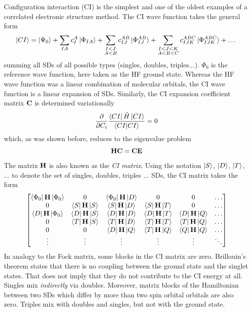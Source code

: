 Configuration interaction (CI) is the simplest and one of the oldest examples of a correlated electronic structure method. The CI wave function takes the general form
\begin{equation}
\ket{CI} = \ket{\smash{\Psi_0}} + \sum_{IA} c_{I}^{A} \ket{\smash{\Phi_{IA}}} + \sum_{\substack{I < J \\ A < B}} c_{IJ}^{AB} \ket{\smash{\Phi_{IJ}^{AB}}} + \sum_{\substack{I < J < K \\ A < B < C}} c_{IJK}^{ABC} \ket{\smash{\Phi_{IJK}^{ABC}}} + \dots
\end{equation}
\noindent summing all SDs of all possible types (singles, doubles, triples...). $\Phi_0$ is the reference wave function, here taken as the HF ground state. Whereas the HF wave function was a linear combination of molecular orbitals, the CI wave function is a linear expansion of SDs. Similarly, the CI expansion coefficient matrix $\mathbf{C}$ is determined variationally
\begin{equation}
\frac{\partial}{\partial C_i} \frac{\bra{\smash{CI}}\hat{H}\ket{\smash{CI}}}{\bra{\smash{CI}}\ket{\smash{CI}}} = 0
\end{equation}
\noindent which, as was shown before, reduces to the eigenvalue problem
\begin{equation}
\mathbf{H}\mathbf{C} = \mathbf{C}\mathbf{E}
\end{equation}
\noindent The matrix $\mathbf{H}$ is also known as the \emph{CI matrix}. Using the notation $\ket{S}$, $\ket{D}$, $\ket{T}$, ... to denote the set of singles, doubles, triples ... SDs, the CI matrix takes the form
\begin{equation}
\begin{bmatrix}
\bra{\Phi_0}\mathbf{H}\ket{\Phi_0} & 0 & \bra{\Phi_0}\mathbf{H}\ket{D} & 0 & 0 & \ldots \\
0 & \bra{S}\mathbf{H}\ket{S} & \bra{S}\mathbf{H}\ket{D} & \bra{S}\mathbf{H}\ket{T} & 0 & \ldots \\
\bra{D}\mathbf{H}\ket{\Phi_0} & \bra{D}\mathbf{H}\ket{S} & \bra{D}\mathbf{H}\ket{D} & \bra{D}\mathbf{H}\ket{T} & \bra{D}\mathbf{H}\ket{Q} & \ldots \\
0 & \bra{T}\mathbf{H}\ket{S} & \bra{T}\mathbf{H}\ket{D} & \bra{T}\mathbf{H}\ket{T} & \bra{T}\mathbf{H}\ket{Q} & \ldots \\
0 & 0 & \bra{D}\mathbf{H}\ket{Q} & \bra{T}\mathbf{H}\ket{Q} & \bra{Q}\mathbf{H}\ket{Q} & \ldots \\
\vdots & \vdots & \vdots & \vdots & \vdots & \ddots  
\end{bmatrix}
\end{equation}
\noindent In analogy to the Fock matrix, some blocks in the CI matrix are zero. Brillouin's theorem states that there is no coupling between the ground state and the singlet states. That does not imply that they do not contribute to the CI energy at all. Singles mix \emph{indirectly} via doubles. Moreover, matrix blocks of the Hamiltonian between two SDs which differ by more than two spin orbital orbitals are also zero. Triples mix with doubles and singles, but not with the ground state.

